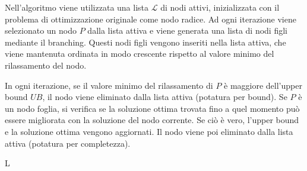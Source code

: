 Nell'algoritmo viene utilizzata una lista $\mathcal{L}$ di nodi attivi, inizializzata con il problema di ottimizzazione originale come nodo radice. Ad ogni iterazione viene selezionato un nodo $P$ dalla lista attiva e viene generata una lista di nodi figli mediante il branching. Questi nodi figli vengono inseriti nella lista attiva, che viene mantenuta ordinata in modo crescente rispetto al valore minimo del rilassamento del nodo. 

In ogni iterazione, se il valore minimo del rilassamento di $P$ è maggiore dell'upper bound $UB$, il nodo viene eliminato dalla lista attiva (potatura per bound). Se $P$ è un nodo foglia, si verifica se la soluzione ottima trovata fino a quel momento può essere migliorata con la soluzione del nodo corrente. Se ciò è vero, l'upper bound e la soluzione ottima vengono aggiornati. Il nodo viene poi eliminato dalla lista attiva (potatura per completezza). 

L
